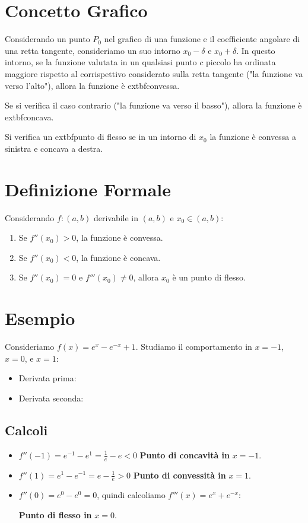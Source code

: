 \documentclass[a4paper,12pt]{article}
\begin{document}
\section*{Concetto Grafico}

Considerando un punto $P_0$ nel grafico di una funzione e il coefficiente angolare di una retta tangente, consideriamo un suo intorno $x_0 - \delta$ e $x_0 + \delta$. In questo intorno, se la funzione valutata in un qualsiasi punto $c$ piccolo ha ordinata maggiore rispetto al corrispettivo considerato sulla retta tangente ("la funzione va verso l'alto"), allora la funzione è 	extbf{convessa}.

Se si verifica il caso contrario ("la funzione va verso il basso"), allora la funzione è 	extbf{concava}.

Si verifica un 	extbf{punto di flesso} se in un intorno di $x_0$ la funzione è convessa a sinistra e concava a destra.

\section*{Definizione Formale}

Considerando $f:(a,b)$ derivabile in $(a,b)$ e $x_0 \in (a,b)$:

\begin{enumerate}
\item Se $f''(x_0) > 0$, la funzione è 	convessa.
\item Se $f''(x_0) < 0$, la funzione è 	concava.
\item Se $f''(x_0) = 0$ e $f'''(x_0) \neq 0$, allora $x_0$ è un 	punto di flesso.
\end{enumerate}

\section*{Esempio}

Consideriamo $f(x) = e^x - e^{-x} + 1$. Studiamo il comportamento in $x = -1$, $x = 0$, e $x = 1$:

\begin{itemize}
\item Derivata prima: 
\item Derivata seconda: 
\end{itemize}

\subsection*{Calcoli}\begin{itemize}
\item $f''(-1) = e^{-1} - e^1 = \frac{1}{e} - e < 0$ \quad \textbf{Punto di concavità in} $x=-1$.
\item $f''(1) = e^1 - e^{-1} = e - \frac{1}{e} > 0$ \quad \textbf{Punto di convessità in} $x=1$.
\item $f''(0) = e^0 - e^0 = 0$, quindi calcoliamo $f'''(x) = e^x + e^{-x}$:

\textbf{Punto di flesso in} $x=0$.
\end{itemize}
\end{document}
